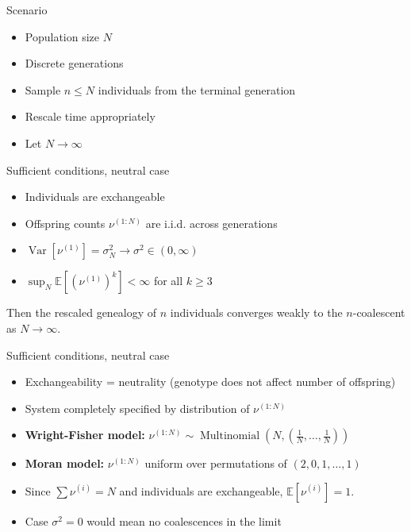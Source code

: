 \documentclass[aspectratio=169]{beamer}
\theoremstyle{definition}
\newcommand{\E}{\mathbb{E}}
\newcommand{\V}{\operatorname{Var}}
\newcommand{\Mn}{\operatorname{Multinomial}}
\begin{document}
\begin{frame}{Scenario}
\begin{itemize}
\item Population size $N$
\item Discrete generations
\item Sample $n \leq N$ individuals from the terminal generation
\item Rescale time appropriately
\item Let $N\to\infty$
\end{itemize}
\end{frame}


\begin{frame}{Sufficient conditions, neutral case}
\begin{theorem}[Kingman 1982]
\begin{itemize}
\item Individuals are exchangeable
\item Offspring counts $\nu^{(1:N)}$ are i.i.d. across generations
\item $\V[ \nu^{(1)} ] = \sigma_N^2 \longrightarrow \sigma^2 \in (0,\infty)$
\item $\sup_N \E[ (\nu^{(1)})^k] <\infty$ for all $k\geq 3$
\end{itemize}
Then the rescaled genealogy of $n$ individuals converges weakly to the $n$-coalescent as $N\to\infty$.
\end{theorem}
\end{frame}


\begin{frame}{Sufficient conditions, neutral case}
\begin{itemize}
\item Exchangeability = neutrality (genotype does not affect number of offspring)
\item System completely specified by distribution of $\nu^{(1:N)}$
\item \textbf{Wright-Fisher model:} $\nu^{(1:N)} \sim \Mn( N, (\frac{1}{N},\dots, \frac{1}{N}) )$
\item \textbf{Moran model:} $\nu^{(1:N)}$ uniform over permutations of $(2,0,1,\dots, 1)$
\item Since $\sum \nu^{(i)} = N$ and individuals are exchangeable, $\E[\nu^{(i)}] = 1$.
\item Case $\sigma^2 = 0$ would mean no coalescences in the limit
\end{itemize}
\end{frame}
\end{document}

